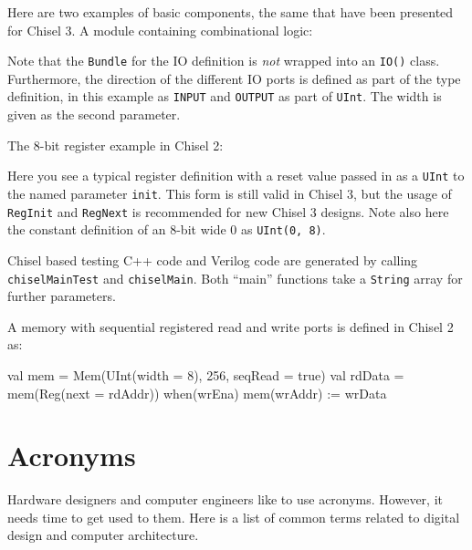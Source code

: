 \documentclass[%
    10pt,
    headinclude, footexclude,
    openright, %
    notitlepage,
    cleardoubleempty,
    headsepline,
    pointlessnumbers,
    bibtotoc, idxtotoc,
    ]{scrbook}
\newcommand{\code}[1]{{\small{\texttt{#1}}}}
\begin{document}
Here are two examples of basic components, the same that have been presented
for Chisel 3. A module containing combinational logic:


Note that the \code{Bundle} for the IO definition is \emph{not} wrapped into
an \code{IO()} class.  Furthermore, the direction of the different IO ports is defined
as part of the type definition, in this example as \code{INPUT} and \code{OUTPUT}
as part of \code{UInt}. The width is given as the second parameter.

\begin{minipage}{\linewidth}
The 8-bit register example in Chisel 2:

\end{minipage}

Here you see a typical register definition with a reset value passed in as
a \code{UInt} to the named parameter \code{init}. This form is still valid in Chisel 3,
but the usage of \code{RegInit} and \code{RegNext} is recommended for new Chisel 3 designs.
Note also here the constant definition of an 8-bit wide 0 as \code{UInt(0, 8)}.

Chisel based testing C++ code and Verilog code are generated by calling \code{chiselMainTest}
and \code{chiselMain}. Both ``main'' functions take a \code{String} array for further parameters.



A memory with sequential registered read and write ports is defined in Chisel 2 as:

\begin{chisel}
  val mem = Mem(UInt(width = 8), 256, seqRead = true)
  val rdData = mem(Reg(next = rdAddr))
  when(wrEna) {
    mem(wrAddr) := wrData
  }
\end{chisel}

\chapter{Acronyms}

Hardware designers and computer engineers like to use acronyms.
However, it needs time to get used to them. Here is a list of common terms
related to digital design and computer architecture.
\end{document}
